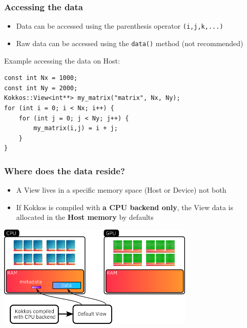 \documentclass[aspectratio=169]{beamer}
\begin{document}

\begin{frame}[fragile]
    \frametitle{Accessing the data}

\begin{itemize}
    \item Data can be accessed using the parenthesis operator \texttt{(i,j,k,...)}
    \item Raw data can be accessed using the \texttt{data()} method (not recommended)
\end{itemize}

Example accessing the data on Host:

\small
\begin{verbatim}
const int Nx = 1000;
const int Ny = 2000;
Kokkos::View<int**> my_matrix("matrix", Nx, Ny);
for (int i = 0; i < Nx; i++) {
    for (int j = 0; j < Ny; j++) {
        my_matrix(i,j) = i + j;
    }
}
\end{verbatim}

\end{frame} 


\begin{frame}[fragile]
    \frametitle{Where does the data reside?}

    \begin{itemize}
        \item A View lives in a specific memory space (Host or Device) not both
        \item If Kokkos is compiled with \textbf{a CPU backend only}, the View data is allocated in the \textbf{Host memory} by defaults
    \end{itemize}

    \centering
    \includegraphics[width=0.7\textwidth]{../../images/host_view_memory.png}

\end{frame} 
\end{document}
